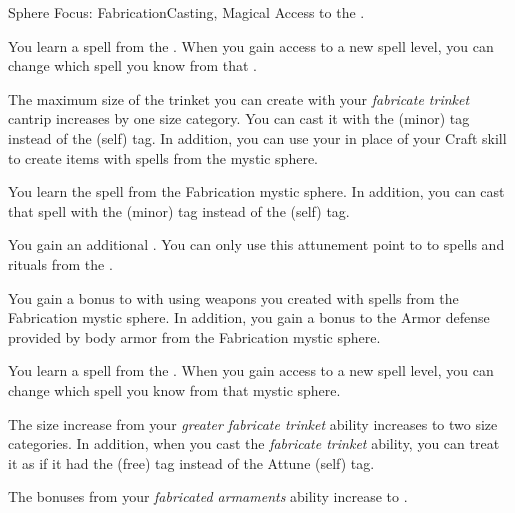     \begin{feat}{Sphere Focus: Fabrication}{Casting, Magical}
        \featpre Access to the  .

         You learn a spell from the  .
        When you gain access to a new spell level, you can change which spell you know from that .

         The maximum size of the trinket you can create with your \textit{fabricate trinket} cantrip increases by one size category.
        You can cast it with the  (minor) tag instead of the  (self) tag.
        In addition, you can use your   in place of your Craft skill to create items with spells from the  mystic sphere.

         You learn the  spell from the Fabrication mystic sphere.
        In addition, you can cast that spell with the  (minor) tag instead of the  (self) tag.

         You gain an additional .
        You can only use this attunement point to  to spells and rituals from the  .

         You gain a  bonus to  with  using weapons you created with spells from the Fabrication mystic sphere.
        In addition, you gain a  bonus to the Armor defense provided by body armor from the Fabrication mystic sphere.

         You learn a spell from the  .
        When you gain access to a new spell level, you can change which spell you know from that mystic sphere.

         The size increase from your \textit{greater fabricate trinket} ability increases to two size categories.
        In addition, when you cast the \textit{fabricate trinket} ability, you can treat it as if it had the  (free) tag instead of the Attune (self) tag.

         The bonuses from your \textit{fabricated armaments} ability increase to .
    \end{feat}

